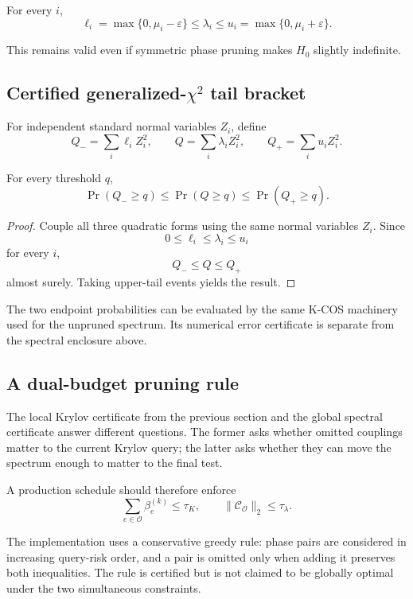 \begin{corollary}
For every \(i\),
\[
\boxed{
\ell_i
=
\max\{0,\mu_i-\varepsilon\}
\le
\lambda_i
\le
u_i
=
\max\{0,\mu_i+\varepsilon\}.
}
\]
\end{corollary}

This remains valid even if symmetric phase pruning makes \(H_0\) slightly
indefinite.

\subsection{Certified generalized-\texorpdfstring{\(\chi^2\)}{chi-square} tail bracket}

For independent standard normal variables \(Z_i\), define
\[
Q_-=\sum_i\ell_iZ_i^2,
\qquad
Q=\sum_i\lambda_iZ_i^2,
\qquad
Q_+=\sum_i u_iZ_i^2.
\]

\begin{theorem}
For every threshold \(q\),
\[
\boxed{
\Pr(Q_-\ge q)
\le
\Pr(Q\ge q)
\le
\Pr(Q_+\ge q).
}
\]
\end{theorem}

\begin{proof}
Couple all three quadratic forms using the same normal variables \(Z_i\).
Since
\[
0\le\ell_i\le\lambda_i\le u_i
\]
for every \(i\),
\[
Q_-\le Q\le Q_+
\]
almost surely.  Taking upper-tail events yields the result.
\end{proof}

The two endpoint probabilities can be evaluated by the same K-COS machinery
used for the unpruned spectrum.  Its numerical error certificate is separate
from the spectral enclosure above.

\subsection{A dual-budget pruning rule}

The local Krylov certificate from the previous section and the global spectral
certificate answer different questions.  The former asks whether omitted
couplings matter to the current Krylov query; the latter asks whether they can
move the spectrum enough to matter to the final test.

A production schedule should therefore enforce
\[
\boxed{
\sum_{e\in\mathcal O}\beta_e^{(k)}
\le
\tau_K,
\qquad
\|\mathcal C_{\mathcal O}\|_2
\le
\tau_\lambda.
}
\]

The implementation uses a conservative greedy rule: phase pairs are considered
in increasing query-risk order, and a pair is omitted only when adding it
preserves both inequalities.  The rule is certified but is not claimed to be
globally optimal under the two simultaneous constraints.

